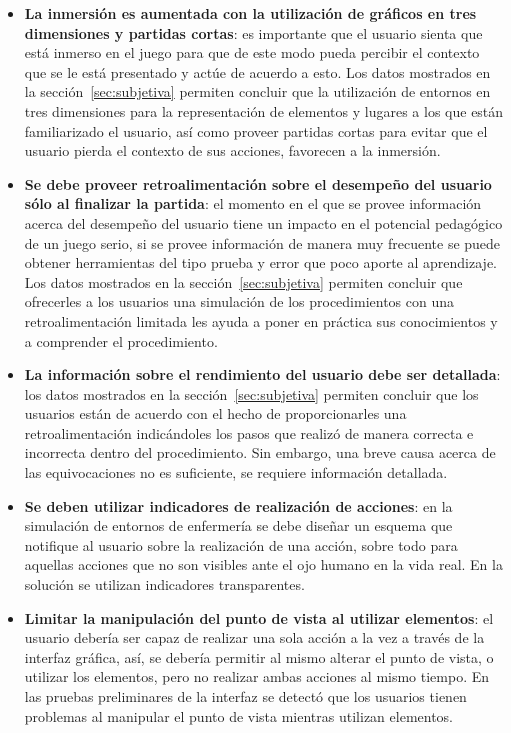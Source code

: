 \begin{itemize}
\item \textbf{La inmersión es aumentada con la utilización de gráficos en tres dimensiones y partidas cortas}: es importante que el usuario sienta que está inmerso en el juego para que de este modo pueda percibir el contexto que se le está presentado y actúe de acuerdo a esto. Los datos mostrados en la sección~\ref{sec:subjetiva} permiten concluir que la utilización de entornos en tres dimensiones para la representación de elementos y lugares a los que están familiarizado el usuario, así como proveer partidas cortas para evitar que el usuario pierda el contexto de sus acciones, favorecen a la inmersión.

\item \textbf{Se debe proveer retroalimentación sobre el desempeño del usuario sólo al finalizar la partida}: el momento en el que se provee información acerca del desempeño del usuario tiene un impacto en el potencial pedagógico de un juego serio, si se provee información de manera muy frecuente se puede obtener herramientas del tipo prueba y error que poco aporte al aprendizaje. Los datos mostrados en la sección~\ref{sec:subjetiva} permiten concluir que ofrecerles a los usuarios una simulación de los procedimientos con una retroalimentación limitada les ayuda a poner en práctica sus conocimientos y a comprender el procedimiento.

\item \textbf{La información sobre el rendimiento del usuario debe ser detallada}: los datos mostrados en la sección~\ref{sec:subjetiva} permiten concluir que los usuarios están de acuerdo con el hecho de proporcionarles una retroalimentación indicándoles los pasos que realizó de manera correcta e incorrecta dentro del procedimiento. Sin embargo, una breve causa acerca de las equivocaciones no es suficiente, se requiere información detallada.

\item \textbf{Se deben utilizar indicadores de realización de acciones}: en la simulación de entornos de enfermería se debe diseñar un esquema que notifique al usuario sobre la realización de una acción, sobre todo para  aquellas acciones que no son visibles ante el ojo humano en la vida real.  En la solución se utilizan indicadores transparentes.

\item \textbf{Limitar la manipulación del punto de vista al utilizar elementos}: el usuario debería ser capaz de realizar una sola acción a la vez a través de la interfaz gráfica, así, se debería permitir al mismo alterar el punto de vista, o utilizar los elementos, pero no realizar ambas acciones al mismo tiempo. En las pruebas preliminares de la interfaz se detectó que los usuarios tienen problemas al manipular el punto de vista mientras utilizan elementos.

\end{itemize}


